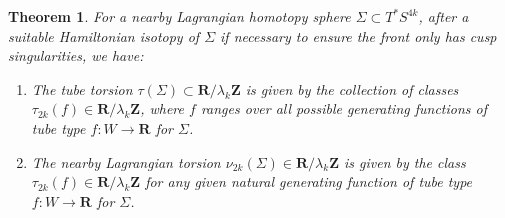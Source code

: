 \documentclass{amsart}
\def\bR{\mathbf{R}}
\def\bZ{\mathbf{Z}}
\newtheorem{theorem}{Theorem}[section]
\theoremstyle{definition}
\theoremstyle{remark}
\newtheorem{inductive lemma}[theorem]{Inductive Lemma}
\begin{document}
  
  \begin{theorem}\label{thm: compute} For a nearby Lagrangian homotopy sphere $\Sigma \subset T^*S^{4k}$, after a suitable Hamiltonian isotopy of $\Sigma$ if necessary to ensure the front only has cusp singularities, we have:
  \begin{enumerate} 
  \item The tube torsion $\tau(\Sigma) \subset \bR/\lambda_k \bZ$ is given by the collection of classes $\tau_{2k}(f) \in \bR/\lambda_k \bZ$,  where $f$ ranges over all possible generating functions of tube type $f:W \to \bR$ for $\Sigma$. 
  \item The nearby Lagrangian torsion $\nu_{2k}(\Sigma) \in \bR/\lambda_k \bZ$ is given by the class $\tau_{2k}(f) \in  \bR/\lambda_k \bZ$  for  any given natural generating function of tube type $f:W \to \bR$ for $\Sigma$.
\end{enumerate}
  \end{theorem} 
\end{document}
